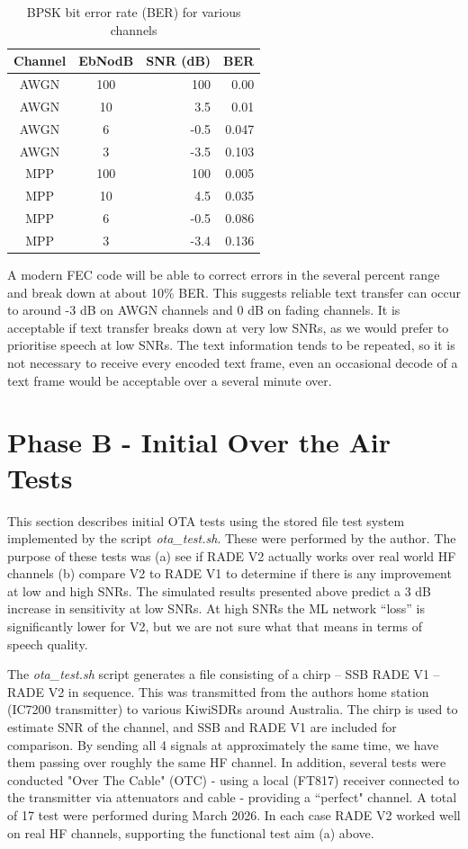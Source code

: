 \documentclass{article}
\begin{document}
\begin{table} [h]
\caption{BPSK bit error rate (BER) for various channels}
\label{tab:bpsk_ber}
\centering
\begin{tabular}{ c | c | r | r }
 \hline
 Channel & EbNodB & SNR (\si{dB}) & BER \\
 \hline
 AWGN & 100 & 100 & 0.00 \\
 AWGN & 10 & 3.5 & 0.01 \\
 AWGN & 6 & -0.5 & 0.047 \\
 AWGN & 3 & -3.5 & 0.103 \\
 MPP & 100 & 100 & 0.005 \\
 MPP & 10 & 4.5 & 0.035 \\
 MPP & 6 & -0.5 & 0.086 \\
 MPP & 3 & -3.4 & 0.136 \\
 \hline
\end{tabular}
\end{table}

A modern FEC code will be able to correct errors in the several percent range and break down at about 10\% BER. This suggests reliable text transfer can occur to around -3 \si{dB} on AWGN channels and 0 \si{dB} on fading channels.  It is acceptable if text transfer breaks down at very low SNRs, as we would prefer to prioritise speech at low SNRs. The text information tends to be repeated, so it is not necessary to receive every encoded text frame, even an occasional decode of a text frame would be acceptable over a several minute over. 

\section{Phase B - Initial Over the Air Tests}

This section describes initial OTA tests using the stored file test system implemented by the script \emph{ota\_test.sh}.  These were performed by the author. The purpose of these tests was (a) see if RADE V2 actually works over real world HF channels (b) compare V2 to RADE V1 to determine if there is any improvement at low and high SNRs.  The simulated results presented above predict a 3 dB increase in sensitivity at low SNRs.  At high SNRs the ML network “loss” is significantly lower for V2, but we are not sure what that means in terms of speech quality.

The \emph{ota\_test.sh} script generates a file consisting of a chirp – SSB RADE V1 – RADE V2 in sequence. This was transmitted from the authors home station (IC7200 transmitter) to various KiwiSDRs around Australia.  The chirp is used to estimate SNR of the channel, and SSB and RADE V1 are included for comparison. By sending all 4 signals at approximately the same time, we have them passing over roughly the same HF channel. In addition, several tests were conducted "Over The Cable" (OTC) - using a local (FT817) receiver connected to the transmitter via attenuators and cable - providing a ``perfect" channel.  A total of 17 test were performed during March 2026. In each case RADE V2 worked well on real HF channels, supporting the functional test aim (a) above.
\end{document}
